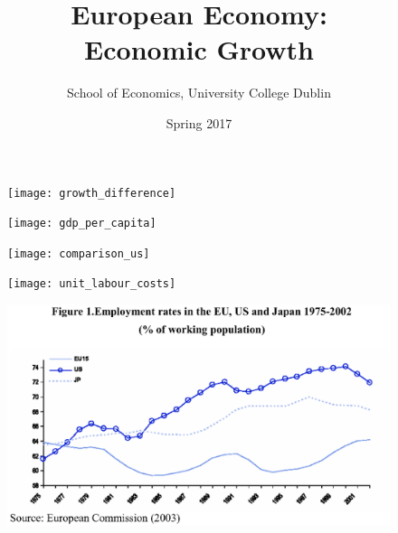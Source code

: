 \documentclass{beamer}
\title{European Economy:\\ Economic Growth}
\author{School of Economics, University College Dublin}
\date{Spring 2017}
\begin{document}
\begin{frame}
\titlepage  
\end{frame}

\begin{frame}
  \begin{figure}
    \texttt{[image: growth\_difference]}
  \end{figure}
\end{frame}


\begin{frame}
  \begin{figure}
    \texttt{[image: gdp\_per\_capita]}
  \end{figure}
\end{frame}

\begin{frame}
  \begin{figure}
    \texttt{[image: comparison\_us]}
  \end{figure}
\end{frame}

\begin{frame}
  \begin{figure}
    \texttt{[image: unit\_labour\_costs]}
  \end{figure}
\end{frame}

\begin{frame}
  \begin{figure}
    \includegraphics[scale=.7]{employment_rate}
  \end{figure}
\end{frame}
\end{document}
